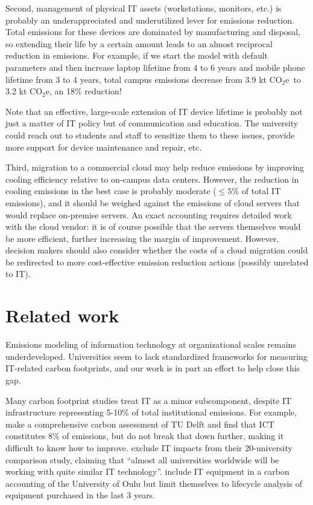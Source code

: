\documentclass[11pt]{article}
\newcommand{\coe}{CO$_2$e}
\newcommand{\tcoe}{t \coe}
\begin{document}
Second, management of physical IT assets (workstations, monitors, etc.) is probably an underappreciated and underutilized lever for emissions reduction. Total emissions for these devices are dominated by manufacturing and disposal, so extending their life by a certain amount leads to an almost reciprocal reduction in emissions. For example, if we start the model with default parameters and then increase laptop lifetime from 4 to 6 years and mobile phone lifetime from 3 to 4 years, total campus emissions decrease from 3.9 k\tcoe\ to 3.2 k\tcoe, an 18\% reduction!

Note that an effective, large-scale extension of IT device lifetime is probably not just a matter of IT policy but of communication and education. The university could reach out to students and staff to sensitize them to these issues, provide more support for device maintenance and repair, etc.

Third, migration to a commercial cloud may help reduce emissions by improving cooling efficiency relative to on-campus data centers. However, the reduction in cooling emissions in the best case is probably moderate ($\le 5$\% of total IT emissions), and it should be weighed against the emissions of cloud servers that would replace on-premise servers. An exact accounting requires detailed work with the cloud vendor: it is of course possible that the servers themselves would be more efficient, further increasing the margin of improvement. However, decision makers should also consider whether the costs of a cloud migration could be redirected to more cost-effective emission reduction actions (possibly unrelated to IT).

\section{Related work}
\label{sec:related:work}

Emissions modeling of information technology at organizational scales remains underdeveloped. Universities seem to lack standardized frameworks for measuring IT-related carbon footprints, and our work is in part an effort to help close this gap.

Many carbon footprint studies treat IT as a minor subcomponent, despite IT infrastructure representing 5-10\% of total institutional emissions. For example, \textcite{herth:quantifying:2022} make a comprehensive carbon assessment of TU Delft and find that ICT constitutes 8\% of emissions, but do not break that down further, making it difficult to know how to improve. \textcite{helmers:universities:2021} exclude IT impacts from their 20-university comparison study, claiming that ``almost all universities worldwide will be working with quite similar IT technology''. \textcite{kiehle:2023} include IT equipment in a carbon accounting of the University of Oulu but limit themselves to lifecycle analysis of equipment purchased in the last 3 years.
\end{document}

